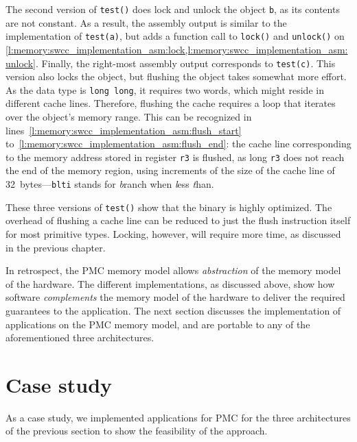 The second version of \lstinline|test()| does lock and unlock the object \lstinline|b|, as its contents are not constant.
As a result, the assembly output is similar to the implementation of \lstinline|test(a)|, but adds a function call to \lstinline|lock()| and \lstinline|unlock()| on \cref{l:memory:swcc_implementation_asm:lock,l:memory:swcc_implementation_asm:unlock}.
Finally, the right-most assembly output corresponds to \lstinline|test(c)|.
This version also locks the object, but flushing the object takes somewhat more effort.
As the data type is \lstinline|long long|, it requires two words, which might reside in different cache lines.
Therefore, flushing the cache requires a loop that iterates over the object's memory range.
This can be recognized in lines~\ref{l:memory:swcc_implementation_asm:flush_start} to~\ref{l:memory:swcc_implementation_asm:flush_end}:
the cache line corresponding to the memory address stored in register \lstinline|r3| is flushed, as long \lstinline|r3| does not reach the end of the memory region, using increments of the size of the cache line of 32~bytes---\lstinline|blti| stands for \textit{b}ranch when \textit{l}ess \textit{t}han.

These three versions of \lstinline|test()| show that the binary is highly optimized.
The overhead of flushing a cache line can be reduced to just the flush instruction itself for most primitive types.
Locking, however, will require more time, as discussed in the previous chapter.

In retrospect, the \ac{PMC} memory model allows \emph{abstraction} of the memory model of the hardware.
The different implementations, as discussed above, show how software \emph{complements} the memory model of the hardware to deliver the required guarantees to the application.
The next section discusses the implementation of applications on the \ac{PMC} memory model, and are portable to any of the aforementioned three architectures.


\section{Case study}

\label{s:memory:case_studies}


As a case study, we implemented applications for \ac{PMC} for the three architectures of the previous section to show the feasibility of the approach.


